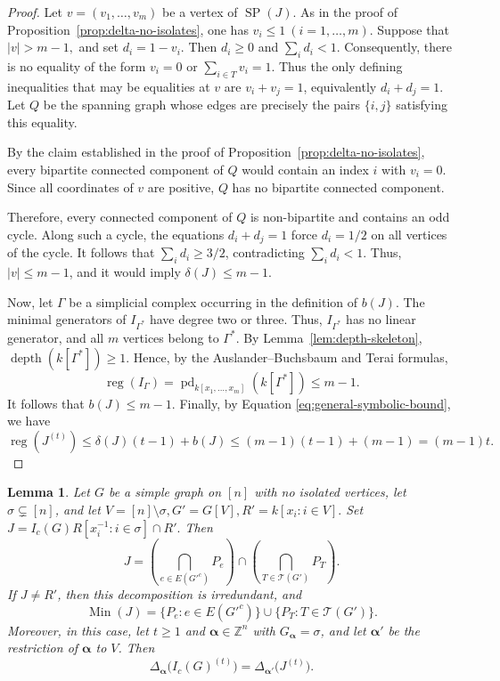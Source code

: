 \documentclass[12pt]{amsart}
\newtheorem{lemma}[proposition]{Lemma}
\DeclareMathOperator{\depth}{depth}
\DeclareMathOperator{\Min}{Min}
\begin{document}
\begin{proof}
Let \(v=(v_1,\ldots,v_m)\) be a vertex of
\(\operatorname{SP}(J)\). As in the proof of
Proposition~\ref{prop:delta-no-isolates}, one has $v_i\leq 1 \ (i=1,\ldots,m).$ Suppose that $|v|>m-1, $ and set $d_i=1-v_i$. Then $d_i\ge0$ and $\sum_i d_i<1$. Consequently, there is no equality of the form $v_i=0$ or $\sum_{i\in T}v_i=1$. Thus the only defining inequalities that may be equalities at $v$ are $v_i+v_j=1$, equivalently $d_i+d_j=1$. Let $Q$ be the spanning graph whose edges are precisely the pairs $\{i,j\}$ satisfying this equality. 

By the claim established in the proof of
Proposition~\ref{prop:delta-no-isolates}, every bipartite connected
component of \(Q\) would contain an index \(i\) with \(v_i=0\).
Since all coordinates of \(v\) are positive, \(Q\) has no bipartite
connected component.

Therefore, every connected component of \(Q\) is non-bipartite and contains an odd cycle. Along such a cycle, the equations $d_i+d_j=1$ force $d_i=1/2$ on all vertices of the cycle. It follows that $\sum_i d_i\ge3/2$, contradicting $\sum_i d_i<1$. Thus, $|v|\le m-1$, and it would imply  $\delta(J)\le m-1$.

Now, let \(\Gamma\) be a simplicial complex occurring in the
definition of \(b(J)\). The minimal generators of
\(I_{\Gamma^*}\) have degree two or three. Thus, \(I_{\Gamma^*}\) has no linear generator, and all \(m\) vertices
belong to \(\Gamma^*\). By Lemma~\ref{lem:depth-skeleton}, $\depth (k[\Gamma^*])\geq 1.$ Hence, by the Auslander--Buchsbaum and Terai formulas,
\[
\operatorname{reg}(I_\Gamma)
=
\operatorname{pd}_{k[x_1,\ldots,x_m]}
(k[\Gamma^*])
\leq m-1.
\]
It follows that $b(J)\leq m-1.$ Finally, by Equation \eqref{eq:general-symbolic-bound}, we have
\[
\operatorname{reg}(J^{(t)})
\leq
\delta(J)(t-1)+b(J)
\leq
(m-1)(t-1)+(m-1)
=
(m-1)t.
\]
\end{proof}


\begin{lemma}\label{lem:localized-ideal}
Let \(G\) be a simple graph on \([n]\) with no isolated vertices, let
\(\sigma\subsetneq[n]\), and let
$V=[n]\setminus\sigma,
G'=G[V], R'=k[x_i:i\in V].$
Set $J=I_c(G)R[x_i^{-1}:i\in\sigma]\cap R'.$
Then
\[
J
=
\left(\bigcap_{e\in E(G'^c)}P_e\right)
\cap
\left(\bigcap_{T\in\mathcal T(G')}P_T\right).
\]
If \(J\neq R'\), then this decomposition is irredundant, and
\[
\Min(J)
=
\{P_e:e\in E(G'^c)\}
\cup
\{P_T:T\in\mathcal T(G')\}.
\]
\noindent
Moreover, in this case, let \(t\ge1\) and
\(\boldsymbol\alpha\in\mathbb Z^n\) with
\(G_{\boldsymbol\alpha}=\sigma\), and let
\(\boldsymbol\alpha'\) be the restriction of
\(\boldsymbol\alpha\) to \(V\). Then
\[
\Delta_{\boldsymbol\alpha}
\bigl(I_c(G)^{(t)}\bigr)
=
\Delta_{\boldsymbol\alpha'}
\bigl(J^{(t)}\bigr).
\]
\end{lemma}
\end{document}
